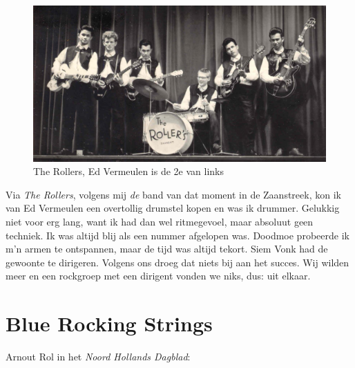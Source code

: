 \documentclass[10pt,twoside, openright]{memoir}
\begin{document}
\begin{figure}
\includegraphics[width=\textwidth]{img/135 rollers-foto1}
\caption*{\footnotesize The Rollers, Ed Vermeulen is de 2e van links}
\end{figure}

Via \emph{The Rollers}, volgens mij \emph{de} band van dat moment in de Zaanstreek, kon ik van Ed Vermeulen een overtollig drumstel kopen en was ik drummer. Gelukkig niet voor erg lang, want ik had dan wel ritmegevoel, maar absoluut geen techniek. Ik was altijd blij als een nummer afgelopen was. Doodmoe probeerde ik m'n armen te ontspannen, maar de tijd was altijd tekort. Siem Vonk had de gewoonte te dirigeren. Volgens ons droeg dat niets bij aan het succes. Wij wilden meer en een rockgroep met een dirigent vonden we niks, dus: uit elkaar. 

\section{Blue Rocking Strings} %
\label{cha:bluerocking}

Arnout Rol in het \emph{Noord Hollands Dagblad}: 
\end{document}
